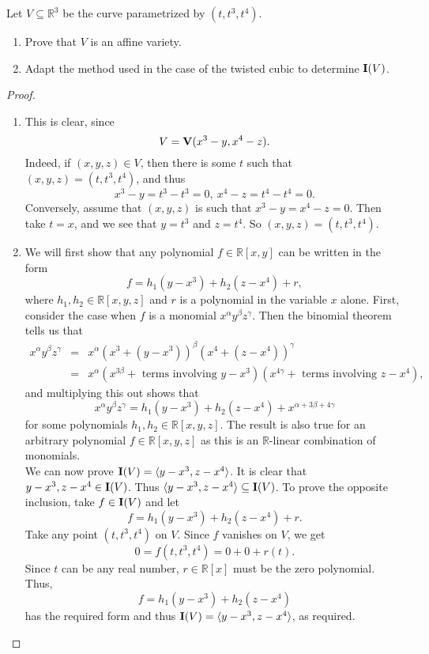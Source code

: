 \begin{exercise}{11}
Let $V\subseteq \mathbb{R}^3$ be the curve parametrized by $(t,t^3, t^4)$.
\begin{enumerate}
    \item Prove that $V$ is an affine variety.
    \item Adapt the method used in the case of the twisted cubic to determine $\mathbf{I}(V)$.
\end{enumerate}
\end{exercise}
\begin{proof}
    \begin{enumerate}
        \item This is clear, since 
        $$V = \mathbf{V}(x^3 - y, x^4 - z).$$
        Indeed, if $(x,y,z)\in V$, then there is some $t$ such that $(x,y,z) = (t,t^3,t^4)$, and thus
        $$x^3 - y = t^3 - t^3 = 0,~x^4 - z = t^4 - t^4 = 0.$$
        Conversely, assume that $(x,y,z)$ is such that $x^3 - y = x^4 - z = 0$. Then take $t = x$, and we see that $y = t^3$ and $z= t^4$. So $(x,y,z) = (t,t^3, t^4)$.
        \item We will first show that any polynomial $f\in \mathbb{R}[x,y]$ can be written in the form
        $$f = h_1(y - x^3) + h_2(z-x^4)+ r,$$
        where $h_1,h_2\in \mathbb{R}[x,y,z]$ and $r$ is a polynomial in the variable $x$ alone. First, consider the case when $f$ is a monomial $x^\alpha y^\beta z^\gamma$. Then the binomial theorem tells us that
        \begin{eqnarray*}
            x^\alpha y^\beta z^\gamma
            & = & x^\alpha (x^3 + (y-x^3))^\beta (x^4 + (z-x^4))^\gamma\\
            & = & x^\alpha (x^{3\beta} + \text{ terms involving }y-x^3)(x^{4\gamma} + \text{ terms involving } z-x^4),
        \end{eqnarray*}
        and multiplying this out shows that
        $$x^\alpha y^\beta z^\gamma = h_1(y-x^3) + h_2(z-x^4) + x^{\alpha + 3\beta + 4\gamma}$$
        for some polynomials $h_1,h_2\in \mathbb{R}[x,y,z]$. The result is also true for an arbitrary polynomial $f\in \mathbb{R}[x,y,z]$ as this is an $\mathbb{R}$-linear combination of monomials.\\
        We can now prove $\mathbf{I}(V) = \langle y-x^3, z-x^4\rangle$. It is clear that $y-x^3, z-x^4\in \mathbf{I}(V)$. Thus $\langle y-x^3, z-x^4\rangle\subseteq \mathbf{I}(V)$. To prove the opposite inclusion, take $f\in \mathbf{I}(V)$ and let
        $$f = h_1(y-x^3) + h_2(z-x^4) + r.$$
        Take any point $(t,t^3,t^4)$ on $V$. Since $f$ vanishes on $V$, we get
        $$0 = f(t,t^3,t^4) = 0+0+r(t).$$
        Since $t$ can be any real number, $r\in \mathbb{R}[x]$ must be the zero polynomial. Thus,
        $$f = h_1(y-x^3) + h_2(z-x^4)$$
        has the required form and thus $\mathbf{I}(V) = \langle y-x^3, z-x^4\rangle$, as required.
    \end{enumerate}
\end{proof}

